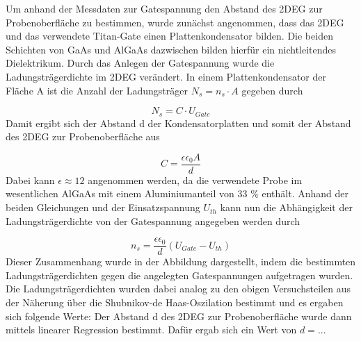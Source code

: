 

Um anhand der Messdaten zur Gatespannung den Abstand des 2DEG zur Probenoberfläche zu bestimmen, wurde zunächst angenommen, dass das 2DEG und das verwendete Titan-Gate einen Plattenkondensator bilden. Die beiden Schichten von GaAs und AlGaAs dazwischen bilden hierfür ein nichtleitendes Dielektrikum. 
Durch das Anlegen der Gatespannung wurde die Ladungsträgerdichte im 2DEG verändert. 
In einem Plattenkondensator der Fläche A ist die Anzahl der Ladungsträger $N_s=n_s \cdot A$ gegeben durch

\begin{equation}
N_s=C \cdot U_{Gate}
\end{equation}
Damit ergibt sich der Abstand d der Kondensatorplatten und somit der Abstand des 2DEG zur Probenoberfläche aus

\begin{equation}
C=\frac{\epsilon \epsilon_0 A}{d}
\end{equation}
Dabei kann $\epsilon \approx 12$ angenommen werden, da die verwendete Probe im wesentlichen AlGaAs mit einem Aluminiumanteil von 33 \% enthält.
Anhand der beiden Gleichungen %
und der Einsatzspannung $U_{th}$ kann nun die Abhängigkeit der Ladungsträgerdichte von der Gatespannung angegeben werden durch 

\begin{equation}
n_s=\frac{\epsilon \epsilon_0}{d}(U_{Gate}-U_{th})
\end{equation}
Dieser Zusammenhang wurde in der Abbildung %
dargestellt, indem die bestimmten Ladungsträgerdichten gegen die angelegten Gatespannungen aufgetragen wurden. 
Die Ladungsträgerdichten wurden dabei analog zu den obigen Versuchsteilen aus der Näherung über die Shubnikov-de Haas-Oszilation %
bestimmt und es ergaben sich folgende Werte: %
Der Abstand d des 2DEG zur Probenoberfläche wurde dann mittels linearer Regression bestimmt. Dafür ergab sich ein Wert von $d=...$ %



